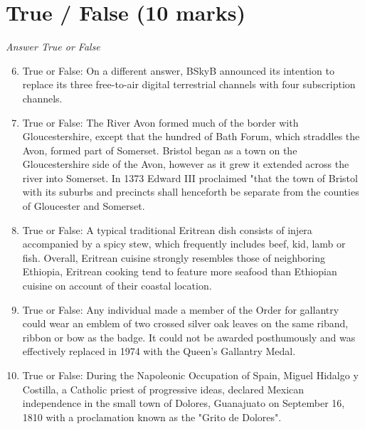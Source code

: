 \documentclass[12pt]{article}
\begin{document}
\section*{True / False (10 marks)}
\textit{Answer True or False}
\begin{enumerate}[label=\arabic*.]
\setcounter{enumi}{5}
\item True or False: On a different answer, BSkyB announced its intention to replace its three free-to-air digital terrestrial channels with four subscription channels.
\item True or False: The River Avon formed much of the border with Gloucestershire, except that the hundred of Bath Forum, which straddles the Avon, formed part of Somerset. Bristol began as a town on the Gloucestershire side of the Avon, however as it grew it extended across the river into Somerset. In 1373 Edward III proclaimed "that the town of Bristol with its suburbs and precincts shall henceforth be separate from the counties of Gloucester and Somerset.
\item True or False: A typical traditional Eritrean dish consists of injera accompanied by a spicy stew, which frequently includes beef, kid, lamb or fish. Overall, Eritrean cuisine strongly resembles those of neighboring Ethiopia, Eritrean cooking tend to feature more seafood than Ethiopian cuisine on account of their coastal location.
\item True or False: Any individual made a member of the Order for gallantry could wear an emblem of two crossed silver oak leaves on the same riband, ribbon or bow as the badge. It could not be awarded posthumously and was effectively replaced in 1974 with the Queen's Gallantry Medal.
\item True or False: During the Napoleonic Occupation of Spain, Miguel Hidalgo y Costilla, a Catholic priest of progressive ideas, declared Mexican independence in the small town of Dolores, Guanajuato on September 16, 1810 with a proclamation known as the "Grito de Dolores".
\end{enumerate}
\end{document}
